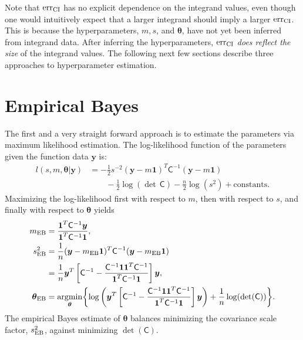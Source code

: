 \documentclass{svjour3}                     %
\newcommand{\bm}[1]{\boldsymbol{#1}}
\newcommand{\vtheta}{{\bm{\theta}}}
\newcommand{\vy}{\bm{y}}
\newcommand{\vone}{\bm{1}}
\newcommand{\mC}{\mathsf{C}}
\newcommand{\mCInv}{\mathsf{C}^{-1}}
\newcommand{\MLE}{\textup{EB}}
\newcommand{\CI}{\textup{CI}}
\newcommand{\err}{\textup{err}}
\providecommand{\argmin}{\operatorname*{argmin}}
\begin{document}
Note that $\err_{\CI}$ has no explicit dependence on the integrand values, even though one would intuitively expect that a larger integrand should imply a larger $\err_{\CI}$.  This is because the hyperparameters, $m, s$, and $\vtheta$, have not yet been inferred from integrand data.  After inferring the hyperparameters, $\err_{\CI}$ \emph{does reflect the size} of the integrand values. The following next few sections describe three approaches to hyperparameter estimation.


\section{Empirical Bayes}  \label{sec:MLE}

The first and a very straight forward approach is to estimate the parameters via maximum likelihood estimation.  The log-likelihood function of the parameters given the function data $\vy$ is:
\begin{align*}
l(s,m,\vtheta | \vy)
&= -\frac{1}{2} s^{-2} (\vy-m\vone)^T\mCInv(\vy-m\vone) 
\\ & \qquad
- \frac{1}{2} \log(\det\, \mC) - \frac{n}{2} \log(s^2) + \text{constants.}
\end{align*}
Maximizing the log-likelihood first with respect to $m$, then with respect to $s$, and finally with respect to $\vtheta$ yields
\begin{align*}
m_\MLE &= \frac{\vone^T \mCInv \vy }{ \vone^T \mCInv \vone}, \\
\nonumber
s^2_{\MLE}  
&= \frac{1}{n} (\vy-m_{\MLE}\vone)^T\mCInv(\vy-m_{\MLE}\vone) 
\\
&= 
\frac{1}{n}
\vy^T 
\left[ 
\mCInv - 
\frac{ \mCInv \vone \vone^T \mCInv }{\vone^T\mCInv \vone}
\right] \vy, \\
\vtheta_\MLE
&= \argmin_{\vtheta} \biggl \{
\log\left(\vy^T 
\left[ \mCInv - 
\frac{ \mCInv \vone \vone^T \mCInv }{\vone^T\mCInv \vone}
\right] \vy 
\right)  +  \frac{1}{n} \log(\det(\mC))
\biggr \}.
\end{align*}
The empirical Bayes estimate of $\vtheta$ balances minimizing the covariance scale factor, $s^2_{\MLE}$, against minimizing  $\det(\mC)$. 
\end{document}
